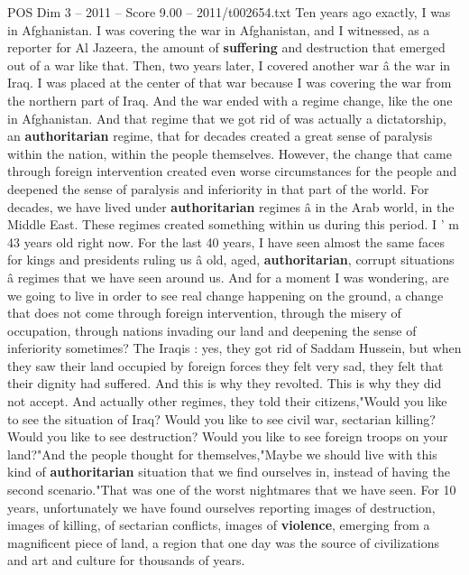 \begin{textsample}{POS Dim 3 – 2011 – Score 9.00 – 2011/t002654.txt}  \label{ex:f3_pos_060}
Ten years ago exactly, I was in Afghanistan.
I was covering the war in Afghanistan, and I witnessed, as a reporter for Al Jazeera, the amount of \textbf{suffering} and destruction that emerged out of a war like that.
Then, two years later, I covered another war â the war in Iraq.
I was placed at the center of that war because I was covering the war from the northern part of Iraq.
And the war ended with a regime change, like the one in Afghanistan.
And that regime that we got rid of was actually a dictatorship, an \textbf{authoritarian} regime, that for decades created a great sense of paralysis within the nation, within the people themselves.
However, the change that came through foreign intervention created even worse circumstances for the people and deepened the sense of paralysis and inferiority in that part of the world.
For decades, we have lived under \textbf{authoritarian} regimes â in the Arab world, in the Middle East.
These regimes created something within us during this period.
I ' m 43 years old right now.
For the last 40 years, I have seen almost the same faces for kings and presidents ruling us â old, aged, \textbf{authoritarian}, corrupt situations â regimes that we have seen around us.
And for a moment I was wondering, are we going to live in order to see real change happening on the ground, a change that does not come through foreign intervention, through the misery of occupation, through nations invading our land and deepening the sense of inferiority sometimes?
The Iraqis : yes, they got rid of Saddam Hussein, but when they saw their land occupied by foreign forces they felt very sad, they felt that their dignity had suffered.
And this is why they revolted.
This is why they did not accept.
And actually other regimes, they told their citizens,"Would you like to see the situation of Iraq?
Would you like to see civil war, sectarian killing?
Would you like to see destruction?
Would you like to see foreign troops on your land?"And the people thought for themselves,"Maybe we should live with this kind of \textbf{authoritarian} situation that we find ourselves in, instead of having the second scenario."That was one of the worst nightmares that we have seen.
For 10 years, unfortunately we have found ourselves reporting images of destruction, images of killing, of sectarian conflicts, images of \textbf{violence}, emerging from a magnificent piece of land, a region that one day was the source of civilizations and art and culture for thousands of years.

\end{textsample}
